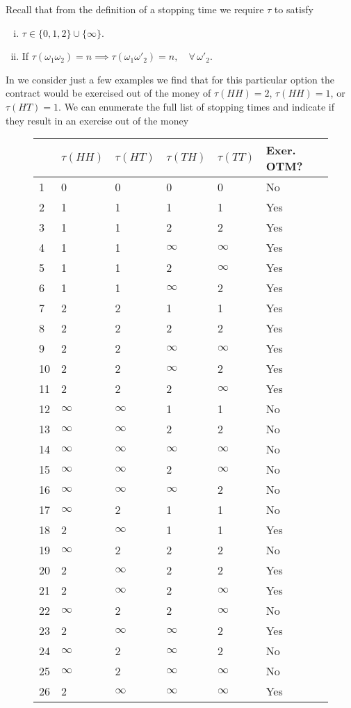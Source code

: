 \documentclass[12pt]{article}
\newlength\tindent
\renewcommand{\indent}{\hspace*{\tindent}}
\begin{document}
Recall that from the definition of a stopping time we require $\tau$ to satisfy
\begin{enumerate}[(i)]
	\item $\tau \in \{0,1,2\}\cup\{\infty\}$.
	\item If $\tau(\omega_1\omega_2) = n \implies \tau(\omega_1\omega'_2) = n,\quad \forall\,\omega'_2$.
\end{enumerate}

\indent In we consider just a few examples we find that for this particular option the contract would be exercised out of the money of $\tau(HH) = 2$, $\tau(HH) = 1$, or $\tau(HT) = 1$. We can enumerate the full list of stopping times and indicate if they result in an exercise out of the money
\begin{figure}[H]
\centering
\begin{tabular}{l|lllll}
	& $\tau(HH)$ & $\tau(HT)$ & $\tau(TH)$ & $\tau(TT)$ & Exer. OTM? \\
	\hline
	1 & 0 & 0 & 0 & 0 & No \\
	2 & 1 & 1 & 1 & 1 & Yes \\
	3 & 1 & 1 & 2 & 2 & Yes \\
	4 & 1 & 1 & $\infty$ & $\infty$ & Yes \\
	5 & 1 & 1 & 2 & $\infty$ & Yes \\
	6 & 1 & 1 & $\infty$ & 2 & Yes \\
	7 & 2 & 2 & 1 & 1 & Yes \\
	8 & 2 & 2 & 2 & 2 & Yes \\
	9 & 2 & 2 & $\infty$ & $\infty$ & Yes \\
	10 & 2 & 2 & $\infty$ & 2 & Yes \\
	11 & 2 & 2 & 2 & $\infty$ & Yes \\
	12 & $\infty$ & $\infty$ & 1 & 1 & No \\
	13 & $\infty$ & $\infty$ & 2 & 2 & No \\
	14 & $\infty$ & $\infty$ & $\infty$ & $\infty$ & No \\
	15 & $\infty$ & $\infty$ & 2 & $\infty$ & No \\
	16 & $\infty$ & $\infty$ & $\infty$ & 2 & No \\
	17 & $\infty$ & 2 & 1 & 1 & No \\
	18 & 2 & $\infty$ & 1 & 1 & Yes \\
	19 & $\infty$ & 2 & 2 & 2 & No \\
	20 & 2 & $\infty$ & 2 & 2 & Yes \\
	21 & 2 & $\infty$ & 2 & $\infty$ & Yes \\
	22 & $\infty$ & 2 & 2 & $\infty$ & No \\
	23 & 2 & $\infty$ & $\infty$ & 2 & Yes \\
	24 & $\infty$ & 2 & $\infty$ & 2 & No \\
	25 & $\infty$ & 2 & $\infty$ & $\infty$ & No \\
	26 & 2 & $\infty$ & $\infty$ & $\infty$ & Yes \\	
\end{tabular}
\end{figure}
\end{document}
